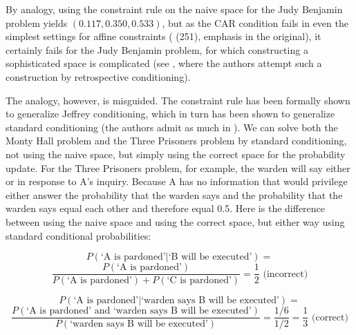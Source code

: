 \documentclass[12pt]{article}
\begin{document}
By analogy, using the constraint rule on the naive space for the Judy
Benjamin problem yields $(0.117,0.350,0.533)$, but as the CAR
condition fails in even the simplest settings for affine constraints
( (251), emphasis in the original),
it certainly fails for the Judy Benjamin problem, for which
constructing a sophisticated space is complicated (see
, where the authors attempt such a
construction by retrospective conditioning).

The analogy, however, is misguided. The constraint rule has been
formally shown to generalize Jeffrey conditioning, which in turn has
been shown to generalize standard conditioning (the authors admit as
much in ). We can solve both the
Monty Hall problem and the Three Prisoners problem by standard
conditioning, not using the naive space, but simply using the correct
space for the probability update. For the Three Prisoners problem, for
example, the warden will say either  or  in response
to A's inquiry. Because A has no information that would privilege
either answer the probability that the warden says  and the
probability that the warden says  equal each other and
therefore equal 0.5. Here is the difference between using the naive
space and using the correct space, but either way using standard
conditional probabilities:

\begin{displaymath}
  P(\mbox{`A is pardoned'}|\mbox{`B will be
    executed'})=
\end{displaymath}
\begin{displaymath}
  \frac{P(\mbox{`A is pardoned'})}{P(\mbox{`A is
      pardoned'})+P(\mbox{`C is pardoned'})}=\frac{1}{2}\mbox{ (incorrect)}
\end{displaymath}

\begin{displaymath}
  P(\mbox{`A is pardoned'}|\mbox{`warden says B will be
    executed'})=
\end{displaymath}
\begin{displaymath}
  \frac{P(\mbox{`A is pardoned' and `warden says B will
      be executed'})}{P(\mbox{`warden says B will be
      executed'})}=\frac{1/6}{1/2}=\frac{1}{3}\mbox{ (correct)}
\end{displaymath}
\end{document}

